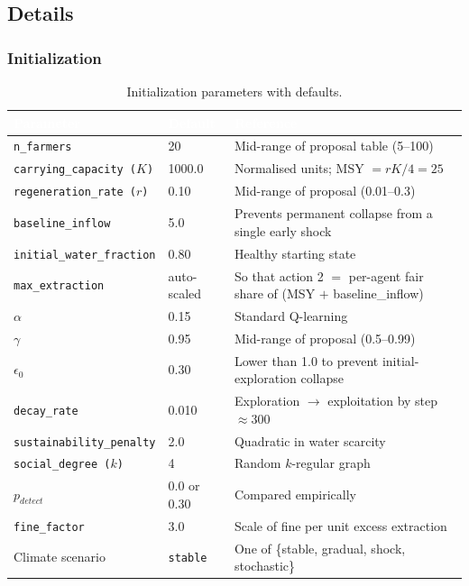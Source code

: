 \documentclass[12pt, a4paper]{article}
\begin{document}
\subsection{Details}

\subsubsection{Initialization}

\begin{table}[H]
    \centering
    \renewcommand{\arraystretch}{1.3}
    \small
    \begin{tabular}{|l|l|p{7.5cm}|}
        \hline
        \rowcolor{nutDark}
        \textcolor{white}{\textbf{Parameter}} & \textcolor{white}{\textbf{Default}} & \textcolor{white}{\textbf{Reference}} \\ \hline
        \texttt{n\_farmers}         & 20    & Mid-range of proposal table (5--100) \\ \hline
        \texttt{carrying\_capacity ($K$)} & 1000.0 & Normalised units; MSY $= rK/4 = 25$ \\ \hline
        \texttt{regeneration\_rate ($r$)} & 0.10 & Mid-range of proposal (0.01--0.3) \\ \hline
        \texttt{baseline\_inflow}   & 5.0   & Prevents permanent collapse from a single early shock \\ \hline
        \texttt{initial\_water\_fraction} & 0.80 & Healthy starting state \\ \hline
        \texttt{max\_extraction}     & auto-scaled & So that action 2 $=$ per-agent fair share of (MSY $+$ baseline\_inflow) \\ \hline
        $\alpha$                    & 0.15  & Standard Q-learning \\ \hline
        $\gamma$                    & 0.95  & Mid-range of proposal (0.5--0.99) \\ \hline
        $\epsilon_0$                & 0.30  & Lower than 1.0 to prevent initial-exploration collapse \\ \hline
        \texttt{decay\_rate}        & 0.010 & Exploration $\to$ exploitation by step $\approx 300$ \\ \hline
        \texttt{sustainability\_penalty} & 2.0 & Quadratic in water scarcity \\ \hline
        \texttt{social\_degree ($k$)} & 4 & Random $k$-regular graph \\ \hline
        $p_{detect}$                & 0.0 or 0.30 & Compared empirically \\ \hline
        \texttt{fine\_factor}        & 3.0 & Scale of fine per unit excess extraction \\ \hline
        Climate scenario            & \texttt{stable} & One of \{stable, gradual, shock, stochastic\} \\ \hline
    \end{tabular}
    \caption{Initialization parameters with defaults.}
\end{table}
\end{document}
